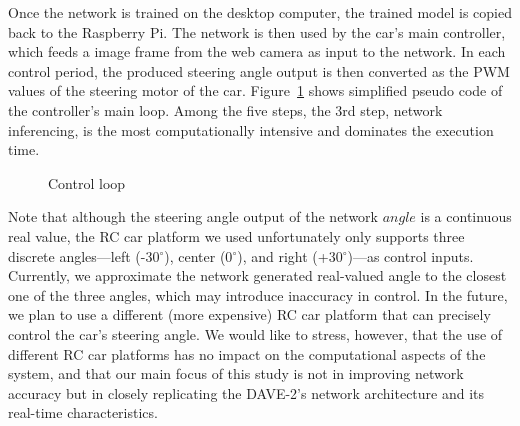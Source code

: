 Once the network is trained on the desktop computer, the trained model
is copied back to the Raspberry Pi. The network is then used
by the car's main controller, which feeds a image frame from the web
camera as input to the network. In each control period, the produced 
steering angle output is then converted as the PWM values of the 
steering motor of the car. Figure~\ref{fig:controlloop} shows simplified 
pseudo code of the controller's main loop. Among the five steps, the 3rd step, 
network inferencing, is the most computationally intensive and dominates the
execution time.

\begin{figure}[t]
  
  \caption{Control loop}
  \label{fig:controlloop}
\end{figure}

Note that although the steering angle output of the network $angle$ is
a continuous real value, the RC car platform we used unfortunately
only supports three discrete angles---left (-30$^{\circ}$), center
(0$^{\circ}$), and right (+30$^{\circ}$)---as control inputs.
Currently, we approximate the network generated real-valued
angle to the closest one of the three angles, which may
introduce inaccuracy in control.
In the future, we plan to use a different (more expensive) RC car
platform that can precisely control the car's steering angle.
We would like to stress, however, that the use of different RC car
platforms has no impact on the computational 
aspects of the system, and that our main focus of this study is
not in improving network accuracy but in closely replicating the
DAVE-2's network architecture and its real-time characteristics.

